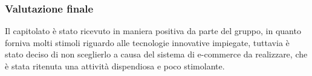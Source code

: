 		\subsubsection{Valutazione finale }
		Il capitolato è stato ricevuto in maniera positiva da parte del gruppo, in quanto forniva molti stimoli riguardo alle tecnologie innovative impiegate, tuttavia è stato deciso di non sceglierlo a causa del sistema di e-commerce da realizzare, che è stata ritenuta una attività dispendiosa e poco stimolante.